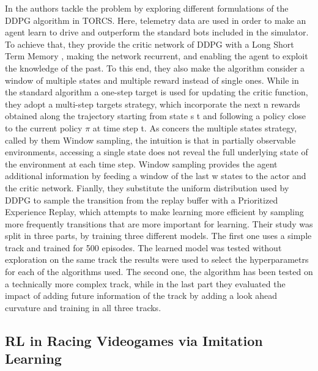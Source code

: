 In \cite{formularl} the authors tackle the problem by exploring different formulations of the DDPG algorithm in TORCS.
Here, telemetry data are used in order to make an agent learn to drive and outperform the standard bots included in the simulator.
To achieve that, they provide the critic network of DDPG with a Long Short Term Memory \cite{lstm}, making the network recurrent, and enabling the agent to exploit the knowledge of the past. To this end, they also make the algorithm consider a window of multiple states and multiple reward instead of single ones.
While in the standard algorithm a one-step target is used for updating the critic function, they adopt a multi-step targets strategy, which incorporate the next n rewards obtained along the trajectory starting from state s t and following a policy close to the current policy \(\pi\) at time step t.
As concers the multiple states strategy, called by them Window sampling, the intuition is that in partially observable environments, accessing a single state does not reveal the full underlying state of the environment at each time step. Window sampling provides the agent additional information by feeding a window of the last w states to the actor and the critic network.
Fianlly, they substitute the uniform distribution used by DDPG to sample the transition from the replay buffer with a Prioritized Experience Replay, which attempts to make learning more efficient by sampling more frequently transitions that are more important for learning.
Their study was split in three parts, by training three different models. The first one uses a simple track and trained for 500 episodes. The learned model was tested without exploration on the
same track the results were used to select the hyperparametrs
for each of the algorithms used. The second one, the algorithm has been tested on a technically more complex track, while in the last part they evaluated the impact of adding future information of the track by adding a look ahead curvature and training in all three tracks.


\subsection{RL in Racing Videogames via Imitation Learning}

